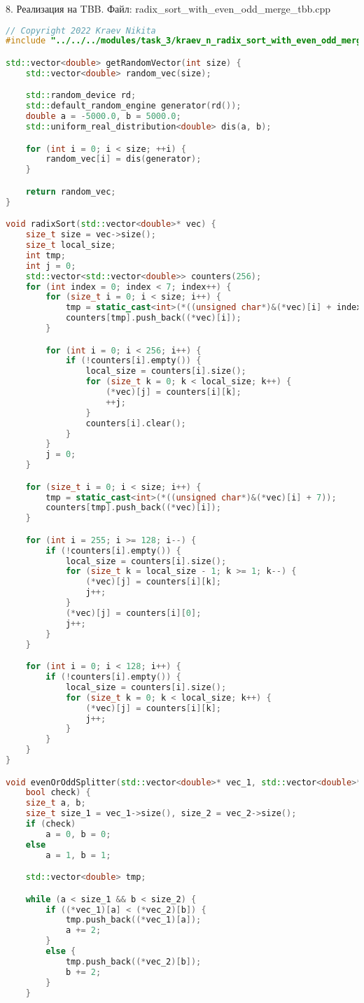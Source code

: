 \documentclass{report}
\begin{document}
\par 8. Реализация на TBB. Файл: radix\_sort\_with\_even\_odd\_merge\_tbb.cpp

\begin{lstlisting}[language=C++]
// Copyright 2022 Kraev Nikita
#include "../../../modules/task_3/kraev_n_radix_sort_with_even_odd_merge_tbb.h"

std::vector<double> getRandomVector(int size) {
	std::vector<double> random_vec(size);

	std::random_device rd;
	std::default_random_engine generator(rd());
	double a = -5000.0, b = 5000.0;
	std::uniform_real_distribution<double> dis(a, b);

	for (int i = 0; i < size; ++i) {
		random_vec[i] = dis(generator);
	}

	return random_vec;
}

void radixSort(std::vector<double>* vec) {
	size_t size = vec->size();
	size_t local_size;
	int tmp;
	int j = 0;
	std::vector<std::vector<double>> counters(256);
	for (int index = 0; index < 7; index++) {
		for (size_t i = 0; i < size; i++) {
			tmp = static_cast<int>(*((unsigned char*)&(*vec)[i] + index));
			counters[tmp].push_back((*vec)[i]);
		}

		for (int i = 0; i < 256; i++) {
			if (!counters[i].empty()) {
				local_size = counters[i].size();
				for (size_t k = 0; k < local_size; k++) {
					(*vec)[j] = counters[i][k];
					++j;
				}
				counters[i].clear();
			}
		}
		j = 0;
	}

	for (size_t i = 0; i < size; i++) {
		tmp = static_cast<int>(*((unsigned char*)&(*vec)[i] + 7));
		counters[tmp].push_back((*vec)[i]);
	}

	for (int i = 255; i >= 128; i--) {
		if (!counters[i].empty()) {
			local_size = counters[i].size();
			for (size_t k = local_size - 1; k >= 1; k--) {
				(*vec)[j] = counters[i][k];
				j++;
			}
			(*vec)[j] = counters[i][0];
			j++;
		}
	}

	for (int i = 0; i < 128; i++) {
		if (!counters[i].empty()) {
			local_size = counters[i].size();
			for (size_t k = 0; k < local_size; k++) {
				(*vec)[j] = counters[i][k];
				j++;
			}
		}
	}
}

void evenOrOddSplitter(std::vector<double>* vec_1, std::vector<double>* vec_2,
	bool check) {
	size_t a, b;
	size_t size_1 = vec_1->size(), size_2 = vec_2->size();
	if (check)
		a = 0, b = 0;
	else
		a = 1, b = 1;

	std::vector<double> tmp;

	while (a < size_1 && b < size_2) {
		if ((*vec_1)[a] < (*vec_2)[b]) {
			tmp.push_back((*vec_1)[a]);
			a += 2;
		}
		else {
			tmp.push_back((*vec_2)[b]);
			b += 2;
		}
	}


\end{lstlisting}
\end{document}

